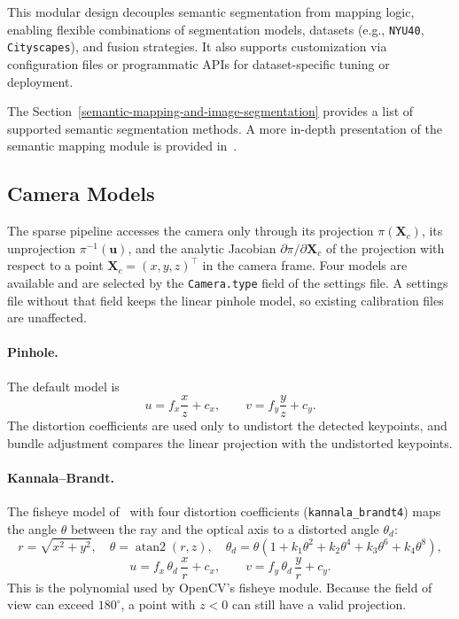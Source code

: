 \documentclass{article}
\let\oldparagraph\paragraph
\renewcommand{\paragraph}[1]{\oldparagraph{#1}\mbox{}}
\begin{document}
This modular design decouples semantic segmentation from mapping logic, enabling flexible combinations of segmentation models, datasets (e.g., \texttt{NYU40}\cite{Silberman:ECCV12}, \texttt{Cityscapes}\cite{Cityscapes}), and fusion strategies. It also supports customization via configuration files or programmatic APIs for dataset-specific tuning or deployment.

The Section~\ref{semantic-mapping-and-image-segmentation} provides a list of supported semantic segmentation methods.
A more in-depth presentation of the semantic mapping module is provided in~\cite{pyslamSemantic2025}.

\hypertarget{camera-models}{%
\subsection{Camera Models}\label{camera-models}}

The sparse pipeline accesses the camera only through its projection $\pi(\mathbf{X}_c)$, its unprojection $\pi^{-1}(\mathbf{u})$, and the analytic Jacobian $\partial \pi / \partial \mathbf{X}_c$ of the projection with respect to a point $\mathbf{X}_c = (x, y, z)^\top$ in the camera frame. Four models are available and are selected by the \texttt{Camera.type} field of the settings file. A settings file without that field keeps the linear pinhole model, so existing calibration files are unaffected.

\paragraph{Pinhole.} The default model is
\begin{equation}
u = f_x \frac{x}{z} + c_x, \qquad v = f_y \frac{y}{z} + c_y .
\end{equation}
The distortion coefficients are used only to undistort the detected keypoints, and bundle adjustment compares the linear projection with the undistorted keypoints.

\paragraph{Kannala--Brandt.} The fisheye model of~\cite{kannala2006generic} with four distortion coefficients (\texttt{kannala\_brandt4}) maps the angle $\theta$ between the ray and the optical axis to a distorted angle $\theta_d$:
\begin{equation}
r = \sqrt{x^2 + y^2}, \quad \theta = \operatorname{atan2}(r, z), \quad
\theta_d = \theta \left(1 + k_1 \theta^2 + k_2 \theta^4 + k_3 \theta^6 + k_4 \theta^8\right),
\end{equation}
\begin{equation}
u = f_x \, \theta_d \, \frac{x}{r} + c_x, \qquad v = f_y \, \theta_d \, \frac{y}{r} + c_y .
\end{equation}
This is the polynomial used by OpenCV's fisheye module. Because the field of view can exceed $180^\circ$, a point with $z < 0$ can still have a valid projection.
\end{document}
